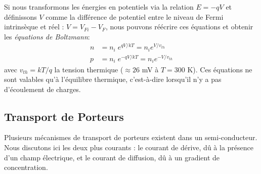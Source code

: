 Si nous transformons les énergies en potentiels via la relation $E = -q V$ et définissons $V$ comme la différence de potentiel entre le niveau de Fermi intrinsèque et réel : $V = V_{Fi} - V_F$, nous pouvons réécrire ces équations et obtenir les \emph{équations de Boltzmann}:
\begin{equation} 
\begin{split}
n &= n_i \; e^{qV/kT}  = n_i e^{V/v_{th}}  \\
p &= n_i \; e^{-qV/kT} = n_i e^{-V/v_{th}}
\label{eq:boltzamnn_eqns}
\end{split}
\end{equation}
avec $v_{th} = kT/q$ la tension thermique ($\approx 26$ mV à $T=300$ K). Ces équations ne sont valables qu'à l'équilibre thermique, c'est-à-dire lorsqu'il n'y a pas d'écoulement de charges.

\subsection{Transport de Porteurs}
Plusieurs mécanismes de transport de porteurs existent dans un semi-conducteur. Nous discutons ici les deux plus courants : le courant de dérive, dû à la présence d'un champ électrique, et le courant de diffusion, dû à un gradient de concentration.
